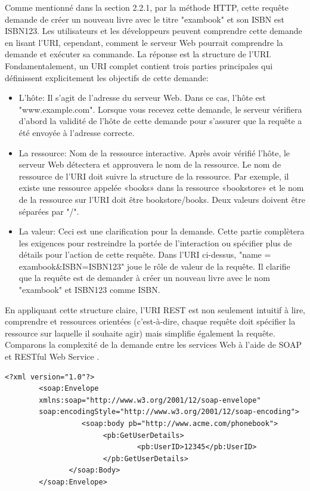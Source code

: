Comme mentionné dans la section 2.2.1, par la méthode HTTP, cette requête demande de créer un nouveau livre avec le titre "exambook" et son ISBN est ISBN123. Les utilisateurs et les développeurs peuvent comprendre cette demande en lisant l'URI, cependant, comment le serveur Web pourrait comprendre la demande et exécuter sa commande. La réponse est la structure de l'URI. Fondamentalement, un URI complet contient trois parties principales qui définissent explicitement les objectifs de cette demande:
\begin{itemize}
\item L'hôte: Il s'agit de l'adresse du serveur Web. Dans ce cas, l'hôte est "www.example.com". Lorsque vous recevez cette demande, le serveur vérifiera d'abord la validité de l'hôte de cette demande pour s'assurer que la requête a été envoyée à l'adresse correcte.
\item La ressource: Nom de la ressource interactive. Après avoir vérifié l'hôte, le serveur Web détectera et approuvera le nom de la ressource. Le nom de ressource de l'URI doit suivre la structure de la ressource. Par exemple, il existe une ressource appelée «books» dans la ressource «bookstore» et le nom de la ressource sur l'URI doit être bookstore/books. Deux valeurs doivent être séparées par "/".
\item La valeur: Ceci est une clarification pour la demande. Cette partie complètera les exigences pour restreindre la portée de l'interaction ou spécifier plus de détails pour l'action de cette requête. Dans l'URI ci-dessus, "name = exambook\&ISBN=ISBN123" joue le rôle de valeur de la requête. Il clarifie que la requête est de demander à créer un nouveau livre avec le nom "exambook" et ISBN123 comme ISBN.
\end{itemize}
En appliquant cette structure claire, l'URI REST est non seulement intuitif à lire, comprendre et ressources orientées (c'est-à-dire, chaque requête doit spécifier la ressource sur laquelle il souhaite agir) mais simplifie également la requête.
Comparons la complexité de la demande entre les services Web à l'aide de SOAP et RESTful Web Service \cite{5}.
\begin{verbatim}
<?xml version="1.0"?>
        <soap:Envelope
        xmlns:soap="http://www.w3.org/2001/12/soap-envelope" 
        soap:encodingStyle="http://www.w3.org/2001/12/soap-encoding">
                  <soap:body pb="http://www.acme.com/phonebook"> 
                       <pb:GetUserDetails>
                               <pb:UserID>12345</pb:UserID>
                       </pb:GetUserDetails>
               </soap:Body>
        </soap:Envelope>
\end{verbatim}
